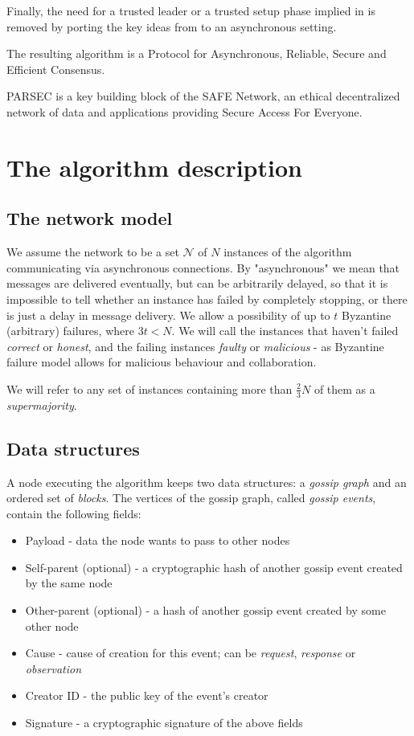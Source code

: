 \documentclass[a4paper,fleqn]{article}
\begin{document}
Finally, the need for a trusted leader or a trusted setup phase implied in \cite{aba} is removed by
porting the key ideas from \cite{trivial} to an asynchronous setting.

The resulting algorithm is a Protocol for Asynchronous, Reliable, Secure and Efficient Consensus.

PARSEC is a key building block of the SAFE Network, an ethical decentralized network of data and
applications providing Secure Access For Everyone.

\section{The algorithm description}

\subsection{The network model}

We assume the network to be a set $\mathcal{N}$ of $N$ instances of the algorithm communicating via
asynchronous connections. By "asynchronous" we mean that messages are delivered eventually,
but can be arbitrarily delayed, so that it is impossible to tell whether an instance has failed
by completely stopping, or there is just a delay in message delivery. We allow a possibility of
up to $t$ Byzantine (arbitrary) failures, where $3t < N$. We will call the instances that haven't
failed \emph{correct} or \emph{honest}, and the failing instances \emph{faulty} or \emph{malicious}
- as Byzantine failure model allows for malicious behaviour and collaboration.

We will refer to any set of instances containing more than $\frac{2}{3}N$ of them as a
\emph{supermajority}.

\subsection{Data structures}

A node executing the algorithm keeps two data structures: a \emph{gossip graph} and an
ordered set of \emph{blocks}. The vertices of the gossip graph, called \emph{gossip events},
contain the following fields:

\begin{itemize}
		\item Payload - data the node wants to pass to other nodes
		\item Self-parent (optional) - a cryptographic hash of another gossip event created by the
			same node
		\item Other-parent (optional) - a hash of another gossip event created by some other node
		\item Cause - cause of creation for this event; can be \emph{request}, \emph{response} or
			\emph{observation}
		\item Creator ID - the public key of the event's creator
		\item Signature - a cryptographic signature of the above fields
\end{itemize}
\end{document}

